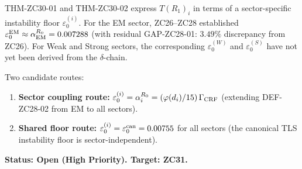 \documentclass[12pt, a4paper]{article}
\begin{document}
\begin{openqbox}[title={GAP-ZC30-01: Sector-Specific
  $\varepsilon_0^{(i)}$ (Open, High Priority)}]
THM-ZC30-01 and THM-ZC30-02 express $T(R_1)_i$ in terms of
a sector-specific instability floor $\varepsilon_0^{(i)}$.
For the EM sector, ZC26--ZC28 established
$\varepsilon_0^{\rm EM} \approx \alpha_{\rm EM}^{R_0} = 0.007288$
(with residual GAP-ZC28-01: $3.49\%$ discrepancy from ZC26).
For Weak and Strong sectors, the corresponding
$\varepsilon_0^{(W)}$ and $\varepsilon_0^{(S)}$ have not
yet been derived from the $\delta$-chain.

Two candidate routes:
\begin{enumerate}[leftmargin=*, noitemsep]
  \item \textbf{Sector coupling route:}
    $\varepsilon_0^{(i)} = \alpha_i^{R_0}
    = (\varphi(d_i)/15)\,\Gamma_{\rm CRF}$
    (extending DEF-ZC28-02 from EM to all sectors).
  \item \textbf{Shared floor route:}
    $\varepsilon_0^{(i)} = \varepsilon_0^{\rm can} = 0.00755$
    for all sectors (the canonical TLS instability floor is
    sector-independent).
\end{enumerate}
\textbf{Status: Open (High Priority). Target: ZC31.}
\end{openqbox}
\end{document}
